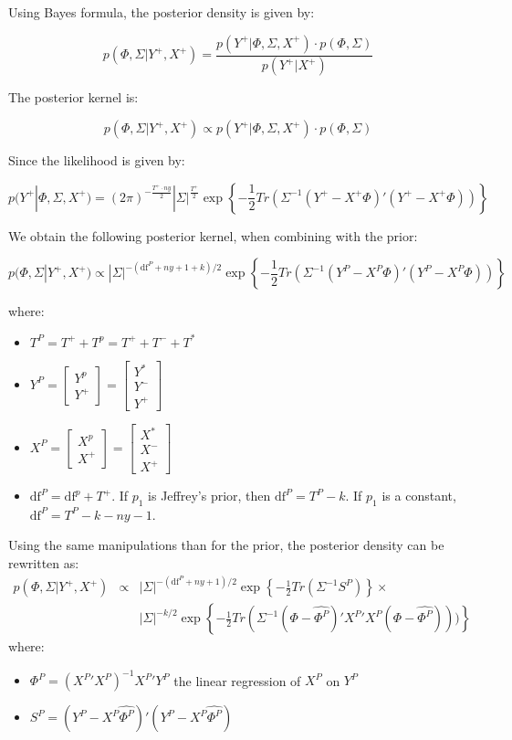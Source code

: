 \documentclass[11pt,a4paper]{article}
\newcommand{\df}{\text{df}}
\begin{document}
Using Bayes formula, the posterior density is given by:

\begin{equation}
\label{bayes-formula}
p(\Phi, \Sigma | Y^+, X^+) = \frac{p(Y^+ | \Phi, \Sigma, X^+) \cdot p(\Phi, \Sigma)}{p(Y^+ | X^+)}
\end{equation}

The posterior kernel is:

$$p(\Phi, \Sigma | Y^+, X^+) \propto p(Y^+ | \Phi, \Sigma, X^+) \cdot p(\Phi, \Sigma)$$

Since the likelihood is given by:

$$p(Y^+ | \Phi, \Sigma, X^+) = (2\pi)^{-\frac{T^+ \cdot ny}{2}} |\Sigma|^{\frac{T^+}{2}} \exp\left\{-\frac{1}{2}Tr(\Sigma^{-1}(Y^+-X^+\Phi)'(Y^+-X^+\Phi))\right\}$$

We obtain the following posterior kernel, when combining with the prior:

$$p(\Phi, \Sigma | Y^+, X^+) \propto  |\Sigma|^{-(\df^P + ny + 1 + k)/2} \exp\left\{-\frac{1}{2}Tr(\Sigma^{-1}(Y^P-X^P\Phi)'(Y^P-X^P\Phi))\right\}$$

where:
\begin{itemize}
\item $T^P = T^+ + T^p = T^+ + T^- + T^*$
\item $Y^P = \left[
\begin{array}{c}
Y^p \\
Y^+
\end{array}
\right]
= \left[
\begin{array}{c}
Y^* \\
Y^- \\
Y^+
\end{array}
\right]$
\item $X^P = \left[
\begin{array}{c}
X^p \\
X^+
\end{array}
\right]
= \left[
\begin{array}{c}
X^* \\
X^- \\
X^+
\end{array}
\right]$
\item $\df^P = \df^p + T^+$. If $p_1$ is Jeffrey's prior, then $\df^P = T^P - k$. If $p_1$ is a constant, $\df^P = T^P - k - ny - 1$.
\end{itemize}

Using the same manipulations than for the prior, the posterior density can be rewritten as:
\begin{eqnarray*}
p(\Phi, \Sigma | Y^+, X^+) & \propto & |\Sigma|^{-(\df^P + ny + 1)/2} \exp\left\{-\frac{1}{2}Tr(\Sigma^{-1}S^P)\right\} \times \\
& & |\Sigma|^{-k/2}\exp\left\{-\frac{1}{2}Tr(\Sigma^{-1}(\Phi-\hat{\Phi^P})'{X^P}'X^P(\Phi-\hat{\Phi^P})))\right\}
\end{eqnarray*}
where:
\begin{itemize}
\item $\hat{\Phi^P} = ({X^P}'X^P)^{-1} {X^P}' Y^P$ the linear regression of $X^P$ on $Y^P$
\item $S^P = (Y^P - X^P\hat{\Phi^P})'(Y^P - X^P\hat{\Phi^P})$
\end{itemize}
\end{document}
